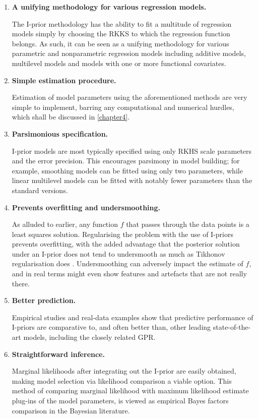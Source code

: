 \documentclass[11pt,twoside,openright,showframe]{report}
\begin{document}
\begin{enumerate}
  \item \textbf{A unifying methodology for various regression models.}
  
  The I-prior methodology has the ability to fit a multitude of regression models simply by choosing the RKKS to which the regression function belongs.
  As such, it can be seen as a unifying methodology for various parametric and nonparametric regression models including additive models, multilevel models and models with one or more functional covariates. 

  \item \textbf{Simple estimation procedure.}
  
  Estimation of model parameters using the aforementioned methods are very simple to implement, barring any computational and numerical hurdles, which shall be discussed in \cref{chapter4}.

  \item \textbf{Parsimonious specification.}
  
  I-prior models are most typically specified using only  RKHS scale parameters and the error precision.
  This encourages parsimony in model building; for example, smoothing models can be fitted using only two parameters, while linear multilevel models can be fitted with notably fewer parameters than the standard versions.
  
  \item \textbf{Prevents overfitting and undersmoothing.}
  
  As alluded to earlier, any function $f$ that passes through the data points is a least squares solution.
  Regularising the problem with the use of I-priors prevents overfitting, with the added advantage that the posterior solution under an I-prior does not tend to undersmooth as much as Tikhonov regularisation does \citep{bergsma2017}.
  Undersmoothing can adversely impact the estimate of $f$, and in real terms might even show features and artefacts that are not really there.
  
  \item \textbf{Better prediction.}
  
  Empirical studies and real-data examples show that predictive performance of I-priors are comparative to, and often better than, other leading state-of-the-art models, including the closely related GPR.

  \item \textbf{Straightforward inference.}
  
  Marginal likelihoods after integrating out the I-prior are easily obtained, making model selection via likelihood comparison a viable option.
  This method of comparing marginal likelihood with maximum likelihood estimate plug-ins of the model parameters, is viewed as empirical Bayes factors comparison in the Bayesian literature.
  
\end{enumerate}
\end{document}
